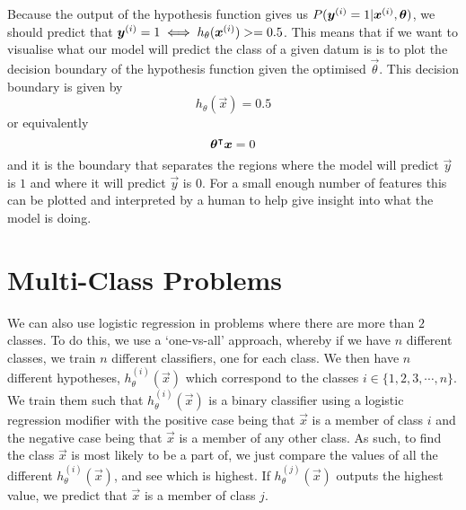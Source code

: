 Because the output of the hypothesis function gives us $P(\bm{y}^{(i)} = 1 | \bm{x}^{(i)}, \bm{\theta})$, we should predict that $\bm{y}^{(i)} = 1 \iff h_{\theta}(\bm{x}^{(i)}) >= 0.5$. This means that if
we want to visualise what our model will predict the class of a given datum is is to plot the decision boundary of the hypothesis function given the optimised $\vec{\theta}$. This decision boundary is given by
\begin{equation}
    h_{\theta}(\vec{x}) = 0.5
\end{equation}
or equivalently
\begin{equation}
    \bm{\theta}^{\intercal}\bm{x} = 0
\end{equation}
and it is the boundary that separates the regions where the model will predict $\vec{y}$ is $1$ and where it will predict $\vec{y}$ is $0$. For a small enough number of features this can be plotted
and interpreted by a human to help give insight into what the model is doing.

\section{Multi-Class Problems}

We can also use logistic regression in problems where there are more than $2$ classes. To do this, we use a `one-vs-all' approach, whereby if we have $n$ different classes, we train
$n$ different classifiers, one for each class. We then have $n$ different hypotheses, $h^{(i)}_{\theta}(\vec{x})$ which correspond to the classes $i \in \{1, 2, 3, \cdots, n\}$. We train them such that
$h^{(i)}_{\theta}(\vec{x})$ is a binary classifier using a logistic regression modifier with the positive case being that $\vec{x}$ is a member of class $i$ and the negative case being that $\vec{x}$ is a member
of any other class. As such, to find the class $\vec{x}$ is most likely to be a part of, we just compare the values of all the different $h^{(i)}_{\theta}(\vec{x})$, and see which is highest. If $h^{(j)}_{\theta}(\vec{x})$ outputs the highest
value, we predict that $\vec{x}$ is a member of class $j$.

